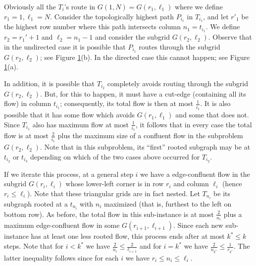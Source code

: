 \documentclass[12pt]{article}
\begin{document}
Obviously all the $T_i$'s route in $G(1,N)=G(r_1,\ell_1)$ where we define $r_1=1,\ell_1=N$.
Consider the topologically highest path $P_{i_1}$ in $T_{i_1}$,
 and let $r'_1$ be the highest row number where this path intersects column $n_1=t_{i_1}$.
We define $r_2 = r_1'+1$ and $\ell_2 = n_1-1$ and consider the subgrid $G(r_2,\ell_2)$.
Observe that in the undirected case it is possible that $P_{i_1}$ routes through the
subgrid $G(r_2,\ell_2)$; see Figure \ref{fig:upperT}(b). In the directed case this cannot happen;
see Figure \ref{fig:upperT}(a).

\begin{figure}[h]\centering
    \qquad
    \caption{}\label{fig:upperT}\end{figure}

In addition, it is possible that $T_{i_2}$ completely avoids routing through the subgrid $G(r_2,\ell_2)$.
But, for this to happen, it must have a cut-edge (containing all its flow) in column $t_{i_1}$;
consequently, its total flow is then at most $\frac{1}{i_1}$. It is also possible that it has some flow which
avoids $G(r_1,\ell_1)$ and some that does not.
Since $T_{i_1}$ also has maximum flow at most $\frac{1}{i_1}$, it follows that in
every case the total flow is at most $\frac{2}{i_1}$ plus the
maximum size of a confluent flow in the subproblem $G(r_2,\ell_2)$. Note that in this subproblem,
its ``first'' rooted subgraph may be at $t_{i_2}$ or $t_{i_3}$ depending on which of the two cases
above occurred for $T_{i_2}$.


If we iterate this process, at a general step $i$ we have a edge-confluent flow in the subgrid $G(r_i,\ell_i)$
whose lower-left corner is in row $r_i$ and column $\ell_i$ (hence $r_i \leq \ell_i$). Note that these triangular grids
are in fact nested.
Let $T_{n_i}$ be its subgraph rooted at a $t_{n_i}$ with $n_i$ maximized (that is, furthest to the left on bottom row).
As before, the total flow in this sub-instance is at most $\frac{2}{n_i}$ plus
a maximum edge-confluent flow in some $G(r_{i+1},\ell_{i+1})$. Since each new sub-instance
has at least one less rooted flow,
this process ends after at most $k^*\le k$ steps.  Note that for $i < k^*$ we have
$\frac{2}{n_i} \leq \frac{2}{\ell_{i+1}}$ and for $i=k^*$ we have $\frac{2}{n_{k^*}} \leq \frac{1}{r_{k^*}}$.
The latter inequality follows since for each $i$ we have $r_i \leq n_i \leq \ell_i$.
\end{document}
